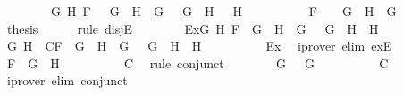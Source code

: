 \begin{isabellebody}
\ \ \ \ \ \ \ \ {\isacharparenleft}{\isasymexists}G{}\ H{}{\isachardot}\ F\ {\isacharequal}\ \isactrlbold {\isasymnot}\ {\isacharparenleft}G{}\ \isactrlbold {\isasymand}\ H{}{\isacharparenright}\ {\isasymand}\ G\ {\isacharequal}\ \isactrlbold {\isasymnot}\ G{}\ {\isasymand}\ H\ {\isacharequal}\ \isactrlbold {\isasymnot}\ H{}{\isacharparenright}\ {\isasymor}\ \isanewline
\ \ \ \ \ \ \ \ F\ {\isacharequal}\ \isactrlbold {\isasymnot}\ {\isacharparenleft}\isactrlbold {\isasymnot}\ G{\isacharparenright}\ {\isasymand}\ H\ {\isacharequal}\ G{\isachardoublequoteclose}\isanewline
\ \ \ \ \isamarkupfalse%
\ {\isacharquery}thesis\isanewline
\ \ \ \ \isamarkupfalse%
\ {\isacharparenleft}rule\ disjE{\isacharparenright}\isanewline
\ \ \ \ \ \ \isamarkupfalse%
\ Ex{}{\isacharcolon}{\isachardoublequoteopen}{\isasymexists}G{}\ H{}{\isachardot}\ F\ {\isacharequal}\ G{}\ \isactrlbold {\isasymrightarrow}\ H{}\ {\isasymand}\ G\ {\isacharequal}\ \isactrlbold {\isasymnot}\ G{}\ {\isasymand}\ H\ {\isacharequal}\ H{}{\isachardoublequoteclose}\isanewline
\ \ \ \ \ \ \isamarkupfalse%
\ G{}\ H{}\ \ C{}{\isacharcolon}{\isachardoublequoteopen}F\ {\isacharequal}\ G{}\ \isactrlbold {\isasymrightarrow}\ H{}\ {\isasymand}\ G\ {\isacharequal}\ \isactrlbold {\isasymnot}\ G{}\ {\isasymand}\ H\ {\isacharequal}\ H{}{\isachardoublequoteclose}\isanewline
\ \ \ \ \ \ \ \ \isamarkupfalse%
\ Ex{}\ \isamarkupfalse%
\ {\isacharparenleft}iprover\ elim{\isacharcolon}\ exE{\isacharparenright}\isanewline
\ \ \ \ \ \ \isamarkupfalse%
\ {\isachardoublequoteopen}F\ {\isacharequal}\ G{}\ \isactrlbold {\isasymrightarrow}\ H{}{\isachardoublequoteclose}\isanewline
\ \ \ \ \ \ \ \ \isamarkupfalse%
\ C{}\ \isamarkupfalse%
\ {\isacharparenleft}rule\ conjunct{}{\isacharparenright}\isanewline
\ \ \ \ \ \ \isamarkupfalse%
\ {\isachardoublequoteopen}G\ {\isacharequal}\ \isactrlbold {\isasymnot}\ G{}{\isachardoublequoteclose}\isanewline
\ \ \ \ \ \ \ \ \isamarkupfalse%
\ C{}\ \isamarkupfalse%
\ {\isacharparenleft}iprover\ elim{\isacharcolon}\ conjunct{}{\isacharparenright}\isanewline

\end{isabellebody}
